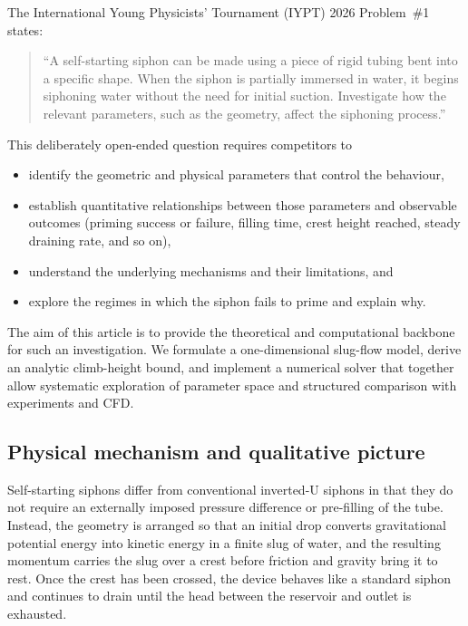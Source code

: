 \documentclass[11pt]{article}
\begin{document}
The International Young Physicists' Tournament (IYPT) 2026 Problem~\#1 states:
\begin{quote}
``A self-starting siphon can be made using a piece of rigid tubing bent into a specific shape. When the siphon is partially immersed in water, it begins siphoning water without the need for initial suction. Investigate how the relevant parameters, such as the geometry, affect the siphoning process.''
\end{quote}
This deliberately open-ended question requires competitors to
\begin{itemize}
  \item identify the geometric and physical parameters that control the behaviour,
  \item establish quantitative relationships between those parameters and observable outcomes (priming success or failure, filling time, crest height reached, steady draining rate, and so on),
  \item understand the underlying mechanisms and their limitations, and
  \item explore the regimes in which the siphon fails to prime and explain why.
\end{itemize}
The aim of this article is to provide the theoretical and computational backbone for such an investigation. We formulate a one-dimensional slug-flow model, derive an analytic climb-height bound, and implement a numerical solver that together allow systematic exploration of parameter space and structured comparison with experiments and CFD.

\subsection{Physical mechanism and qualitative picture}

Self-starting siphons differ from conventional inverted-U siphons in that they do not require
an externally imposed pressure difference or pre-filling of the tube. Instead, the geometry is
arranged so that an initial drop converts gravitational potential energy into kinetic energy in
a finite slug of water, and the resulting momentum carries the slug over a crest before friction
and gravity bring it to rest. Once the crest has been crossed, the device behaves like a standard
siphon and continues to drain until the head between the reservoir and outlet is exhausted.
\end{document}
